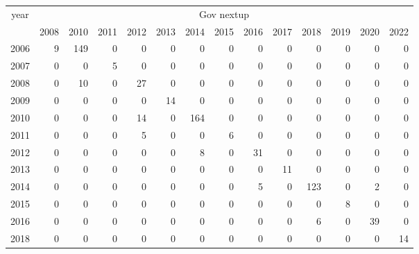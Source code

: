 \footnotesize\begin{tabular}[t]{lrrrrrrrrrrrrr}
\toprule
\multicolumn{1}{c}{year} & \multicolumn{13}{c}{Gov nextup} \\
\cmidrule(l{3pt}r{3pt}){1-1} \cmidrule(l{3pt}r{3pt}){2-14}
  & 2008 & 2010 & 2011 & 2012 & 2013 & 2014 & 2015 & 2016 & 2017 & 2018 & 2019 & 2020 & 2022\\
\midrule
2006 & 9 & 149 & 0 & 0 & 0 & 0 & 0 & 0 & 0 & 0 & 0 & 0 & 0\\
2007 & 0 & 0 & 5 & 0 & 0 & 0 & 0 & 0 & 0 & 0 & 0 & 0 & 0\\
2008 & 0 & 10 & 0 & 27 & 0 & 0 & 0 & 0 & 0 & 0 & 0 & 0 & 0\\
2009 & 0 & 0 & 0 & 0 & 14 & 0 & 0 & 0 & 0 & 0 & 0 & 0 & 0\\
2010 & 0 & 0 & 0 & 14 & 0 & 164 & 0 & 0 & 0 & 0 & 0 & 0 & 0\\
2011 & 0 & 0 & 0 & 5 & 0 & 0 & 6 & 0 & 0 & 0 & 0 & 0 & 0\\
2012 & 0 & 0 & 0 & 0 & 0 & 8 & 0 & 31 & 0 & 0 & 0 & 0 & 0\\
2013 & 0 & 0 & 0 & 0 & 0 & 0 & 0 & 0 & 11 & 0 & 0 & 0 & 0\\
2014 & 0 & 0 & 0 & 0 & 0 & 0 & 0 & 5 & 0 & 123 & 0 & 2 & 0\\
2015 & 0 & 0 & 0 & 0 & 0 & 0 & 0 & 0 & 0 & 0 & 8 & 0 & 0\\
2016 & 0 & 0 & 0 & 0 & 0 & 0 & 0 & 0 & 0 & 6 & 0 & 39 & 0\\
2018 & 0 & 0 & 0 & 0 & 0 & 0 & 0 & 0 & 0 & 0 & 0 & 0 & 14\\
\bottomrule
\end{tabular}
